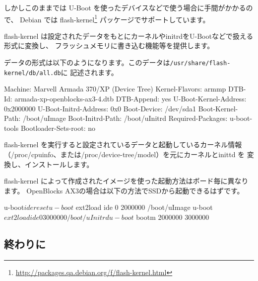 \documentclass[mingoth,a4paper]{jsarticle}
\begin{document}
しかしこのままでは U-Boot を使ったデバイスなどで使う場合に手間がかかるので、
Debian では flash-kernel\footnote{\url{http://packages.qa.debian.org/f/flash-kernel.html}}
パッケージでサポートしています。

flash-kernel は設定されたデータをもとにカーネルやinitrdをU-Bootなどで扱える形式に変換し、
フラッシュメモリに書き込む機能等を提供します。

データの形式は以下のようになります。このデータは\texttt{/usr/share/flash-kernel/db/all.db}に
記述されます。

\begin{commandline}
Machine: Marvell Armada 370/XP (Device Tree)
Kernel-Flavors: armmp
DTB-Id: armada-xp-openblocks-ax3-4.dtb
DTB-Append: yes
U-Boot-Kernel-Address: 0x2000000
U-Boot-Initrd-Address: 0x0
Boot-Device: /dev/sda1
Boot-Kernel-Path: /boot/uImage
Boot-Initrd-Path: /boot/uInitrd
Required-Packages: u-boot-tools
Bootloader-Sets-root: no
\end{commandline}

flash-kernel を実行すると設定されているデータと起動しているカーネル情報
（/proc/cpuinfo、または/proc/device-tree/model）を元にカーネルとinittd を
変換し、インストールします。

flash-kernel によって作成されたイメージを使った起動方法はボード毎に異なります。
OpenBlocks AX3の場合は以下の方法でSSDから起動できるはずです。

\begin{commandline}
u-boot$ ide reset
u-boot$ ext2load ide 0 2000000 /boot/uImage
u-boot$ ext2load ide 0 3000000 /boot/uInitrd
u-boot$ bootm 2000000 3000000
\end{commandline}


\subsection{終わりに}
\end{document}
